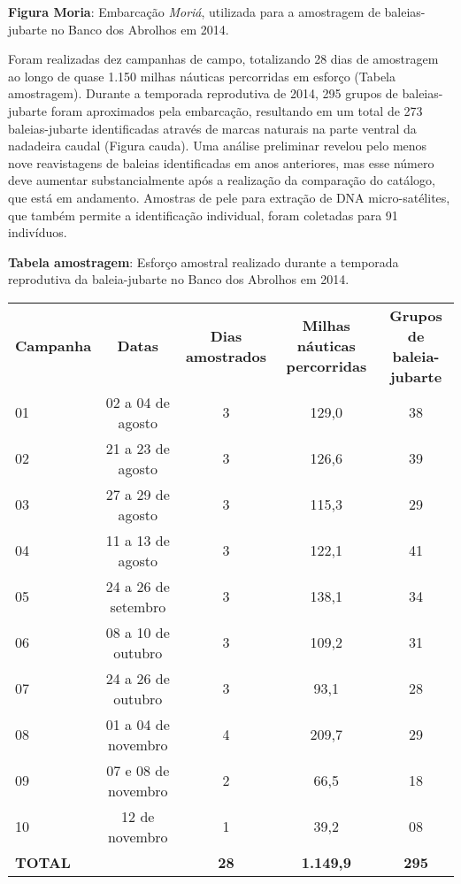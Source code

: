 \textbf{Figura Moria}: Embarcação \textit{Moriá}, utilizada para a amostragem de baleias-jubarte no Banco dos Abrolhos em 2014.

Foram realizadas dez campanhas de campo, totalizando 28 dias de amostragem ao longo de quase 1.150 milhas náuticas percorridas em esforço (Tabela amostragem). Durante a temporada reprodutiva de 2014, 295 grupos de baleias-jubarte foram aproximados pela embarcação, resultando em um total de 273 baleias-jubarte identificadas através de marcas naturais na parte ventral da nadadeira caudal (Figura cauda). Uma análise preliminar revelou pelo menos nove reavistagens de baleias identificadas em anos anteriores, mas esse número deve aumentar substancialmente após a realização da comparação do catálogo, que está em andamento. Amostras de pele para extração de DNA micro-satélites, que também permite a identificação individual, foram coletadas para 91 indivíduos.

\textbf{Tabela amostragem}: Esforço amostral realizado durante a temporada reprodutiva da baleia-jubarte no Banco dos Abrolhos em 2014.  

\begin{tabular}{lcccc}  
\textbf{Campanha} & \textbf{Datas} & \textbf{Dias amostrados} & \textbf{Milhas náuticas percorridas} & \textbf{Grupos de baleia-jubarte} \\
01 & 02 a 04 de agosto & 3 & 129,0 & 38 \\
02 & 21 a 23 de agosto & 3 & 126,6 & 39 \\
03 & 27 a 29 de agosto & 3 & 115,3 & 29 \\
04 & 11 a 13 de agosto & 3 & 122,1 & 41 \\
05 & 24 a 26 de setembro & 3 & 138,1 & 34 \\
06 & 08 a 10 de outubro & 3 & 109,2 & 31 \\
07 & 24 a 26 de outubro & 3 & 93,1 & 28 \\
08 & 01 a 04 de novembro & 4 & 209,7 & 29 \\
09 & 07 e 08 de novembro & 2 & 66,5 & 18 \\
10 & 12 de novembro & 1 & 39,2 & 08 \\
\textbf{TOTAL} & & \textbf{28} & \textbf{1.149,9} & \textbf{295} \\
\end{tabular}    
